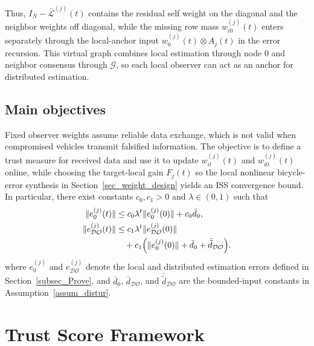 \documentclass[journal,twoside]{IEEEtran}
\def\G{\mathcal{G}} %
\def\L{\mathcal{L}} %
\def\DO{\mathcal{DO}} %
\begin{document}
    Thus, $I_N-\bar{\L}^{(j)}(t)$ contains the residual self weight on the diagonal and the neighbor weights off diagonal, while the missing row mass $w_{i0}^{(j)}(t)$ enters separately through the local-anchor input $w_0^{(j)}(t)\otimes A_j(t)$ in the error recursion. This virtual graph combines local estimation through node $0$ and neighbor consensus through $\G$, so each local observer can act as an anchor for distributed estimation.

\subsection{Main objectives}
Fixed observer weights assume reliable data exchange, which is not valid when compromised vehicles transmit falsified information. The objective is to define a trust measure for received data and use it to update $w_{il}^{(j)}(t)$ and $w_{i0}^{(j)}(t)$ online, while choosing the target-local gain $F_j(t)$ so the local nonlinear bicycle-error synthesis in Section~\ref{sec_weight_design} yields an ISS convergence bound. In particular, there exist constants $c_0, c_1 > 0$ and $\lambda \in (0,1)$ such that
\begin{align}
\|e_0^{(j)}(t)\| &\le c_0\lambda^t \|e_0^{(j)}(0)\| + c_0 \bar{d}_0,\label{eq_iss_e0}\\
\|e_{\DO}^{(j)}(t)\| &\le c_1\lambda^t \|e_{\DO}^{(j)}(0)\| \notag\\
&\quad+ c_1 \Big(\|e_0^{(j)}(0)\| + \bar{d}_0 + \bar{\tilde d}_{\DO}\Big). \label{eq_iss_edo}
\end{align}
where $e_0^{(j)}$ and $e_{\DO}^{(j)}$ denote the local and distributed estimation errors defined in Section~\ref{subsec_Prove}, and $\bar{d}_0$, $\bar{d}_{\DO}$, and $\bar{\tilde{d}}_{\DO}$ are the bounded-input constants in Assumption~\ref{assum_distur}.


\section{Trust Score Framework}\label{sec_trust_score}
\end{document}

